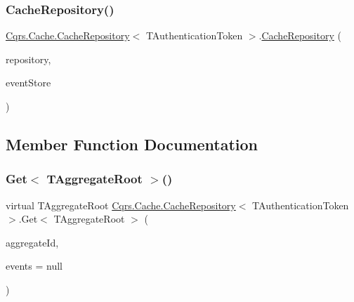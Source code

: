 \subsubsection{\texorpdfstring{Cache\+Repository()}{CacheRepository()}}
{\footnotesize\ttfamily \hyperlink{classCqrs_1_1Cache_1_1CacheRepository}{Cqrs.\+Cache.\+Cache\+Repository}$<$ T\+Authentication\+Token $>$.\hyperlink{classCqrs_1_1Cache_1_1CacheRepository}{Cache\+Repository} (\begin{DoxyParamCaption}\item[{\hyperlink{interfaceCqrs_1_1Domain_1_1IAggregateRepository}{I\+Aggregate\+Repository}$<$ T\+Authentication\+Token $>$}]{repository,  }\item[{\hyperlink{interfaceCqrs_1_1Events_1_1IEventStore}{I\+Event\+Store}$<$ T\+Authentication\+Token $>$}]{event\+Store }\end{DoxyParamCaption})}



\subsection{Member Function Documentation}
\mbox{\label{classCqrs_1_1Cache_1_1CacheRepository_a037acba636aedf23ff376ac0b749ec0c_a037acba636aedf23ff376ac0b749ec0c}} 
\subsubsection{\texorpdfstring{Get$<$ T\+Aggregate\+Root $>$()}{Get< TAggregateRoot >()}}
{\footnotesize\ttfamily virtual T\+Aggregate\+Root \hyperlink{classCqrs_1_1Cache_1_1CacheRepository}{Cqrs.\+Cache.\+Cache\+Repository}$<$ T\+Authentication\+Token $>$.Get$<$ T\+Aggregate\+Root $>$ (\begin{DoxyParamCaption}\item[{Guid}]{aggregate\+Id,  }\item[{I\+List$<$ \hyperlink{interfaceCqrs_1_1Events_1_1IEvent}{I\+Event}$<$ T\+Authentication\+Token $>$$>$}]{events = {\ttfamily null} }\end{DoxyParamCaption})\hspace{0.3cm}{\ttfamily [virtual]}}



